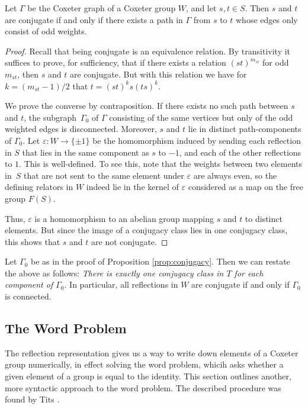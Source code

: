 \documentclass[main.tex]{subfiles}
\begin{document}
\begin{proposition}\label{prop:conjugacy}
	Let $\Gamma$ be the Coxeter graph of a Coxeter group $W$,
	and let $s, t \in S$. Then $s$ and $t$ are conjugate if and
	only if there exists a path in $\Gamma$ from $s$ to $t$
	whose edges only consist of odd weights.
\end{proposition}

\begin{proof}
Recall that being conjugate is an equivalence relation. By 
transitivity it suffices to prove, for sufficiency, that if 
there exists a relation $(st)^{m_{st}}$ for odd $m_{st}$, then $s$ 
and $t$ are conjugate. But with this relation we have 
for $k = (m_{st}-1)/2$ that $t = (st)^ks(ts)^k$.

We prove the converse by contraposition. If there exists no 
such path between $s$ and $t$, the subgraph~$\Gamma_0$ of 
$\Gamma$ consisting of the same vertices but only of the odd
weighted edges is disconnected. Moreover, $s$ and $t$ lie in
distinct path-components of $\Gamma_0$. Let 
$\varepsilon: W \rightarrow \{\pm1\}$ be the homomorphism
induced by sending each reflection in $S$ that lies in the 
same component as $s$ to $-1$, and each of the other reflections 
to $1$. This is well-defined. To see this, note that the weights 
between two elements in~$S$ that are not sent to the same 
element under $\varepsilon$ are always even, so the defining relators 
in $W$ indeed lie in the kernel of $\varepsilon$ considered as a 
map on the free group $F(S)$.

Thus, $\varepsilon$ is a homomorphism to an abelian group 
mapping $s$ and $t$ to distinct elements. But since the image of 
a conjugacy class lies in one conjugacy class, this shows that 
$s$ and $t$ are not conjugate.
\end{proof}

Let $\Gamma_0$ be as in the proof of Proposition 
\ref{prop:conjugacy}. Then we can restate the above as follows: 
\textit{There is exactly one conjugacy class in $T$ for each 
component of $\Gamma_0$}. In particular, all reflections in $W$ 
are conjugate if and only if $\Gamma_0$ is connected.

\subsection{The Word Problem}
The reflection representation gives us a way to write down elements of a Coxeter group numerically, in effect solving the word problem, whicih asks whether a given element of a group is equal to the identity. This section outlines another, more syntactic approach to the word problem. The described procedure was found by Tits \cite{tits1969}.
\end{document}
